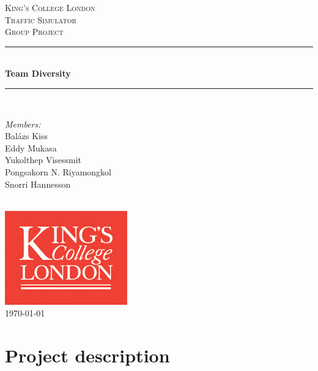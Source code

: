 \documentclass[11pt]{article}
\begin{document}

\begin{titlepage}

\newcommand{\HRule}{\rule{\linewidth}{0.5mm}}
\center
\textsc{\LARGE King's College London}\\[1.5cm]
\textsc{\Large Traffic Simulator}\\[0.5cm]
\textsc{\large Group Project}\\[0.5cm]
\HRule \\[0.4cm]
{ \huge \bfseries Team Diversity}\\[0.4cm]
\HRule \\[1.5cm]

\begin{minipage}{0.4\textwidth} \large
\begin{center}
\emph{Members:}\\
Balázs Kiss \\
Eddy Mukasa \\
Yukolthep Visessmit \\
Pongsakorn N. Riyamongkol \\
Snorri Hannesson
\end{center}
\end{minipage}
\\[2cm]

\includegraphics{KingsLogo}\\[1cm] 

{\large \today}\\[3cm]

\vfill

\end{titlepage}


\section{Project description}
\end{document}
